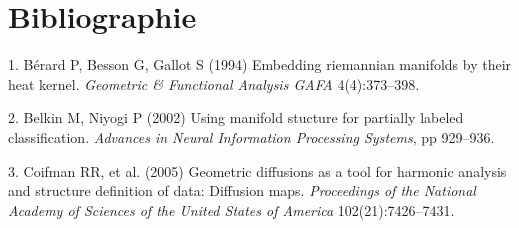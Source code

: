 \documentclass[9pt,twocolumn,twoside,]{pnas-new}
\begin{document}
\newpage

\hypertarget{bibliographie}{%
\section*{Bibliographie}\label{bibliographie}}

\hypertarget{refs}{}
\leavevmode\hypertarget{ref-berard1994embedding}{}%
1. Bérard P, Besson G, Gallot S (1994) Embedding riemannian manifolds by
their heat kernel. \emph{Geometric \& Functional Analysis GAFA}
4(4):373--398.

\leavevmode\hypertarget{ref-belkin2002using}{}%
2. Belkin M, Niyogi P (2002) Using manifold stucture for partially
labeled classification. \emph{Advances in Neural Information Processing
Systems}, pp 929--936.

\leavevmode\hypertarget{ref-coifman2005geometric}{}%
3. Coifman RR, et al. (2005) Geometric diffusions as a tool for harmonic
analysis and structure definition of data: Diffusion maps.
\emph{Proceedings of the National Academy of Sciences of the United
States of America} 102(21):7426--7431.



% 
\end{document}

